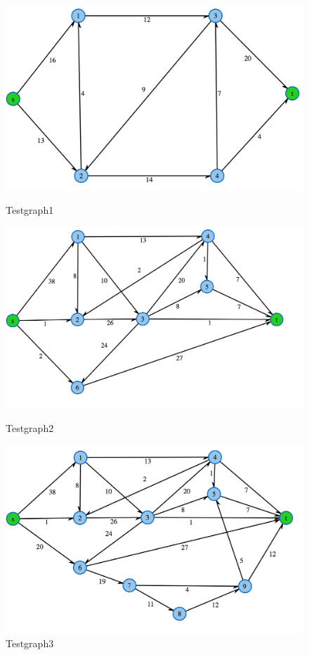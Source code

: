 \documentclass[a4paper]{llncs}
\begin{document}
\begin{figure}[htbp] 
  \centering
     \includegraphics[scale=0.3]{testgraph1} 
  \caption{Testgraph1}
  \label{fig:Breitensuche}

 
  \centering
     \includegraphics[scale=0.3]{testgraph2} 
  \caption{Testgraph2}
  \label{fig:Breitensuche}
 
  \centering
     \includegraphics[scale=0.3]{testgraph3} 
  \caption{Testgraph3}
  \label{fig:Breitensuche}
\end{figure}
\end{document}
